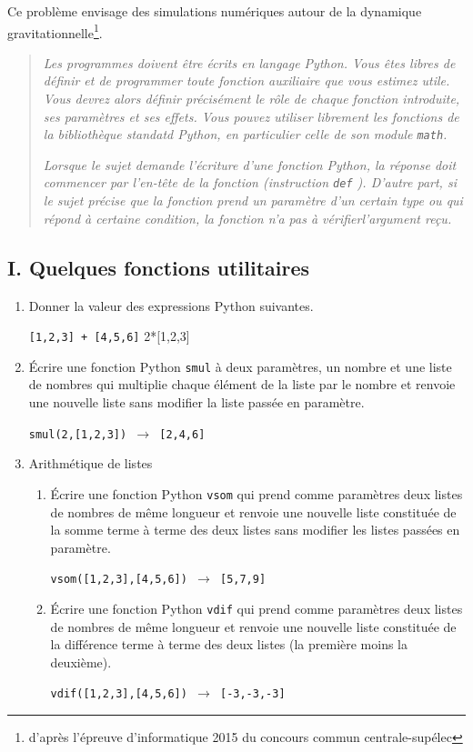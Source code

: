 Ce problème envisage des simulations numériques autour de la dynamique gravitationnelle\footnote{d'après l'épreuve d'informatique 2015 du concours commun centrale-supélec}.

\begin{quotation}
\textit{
Les programmes doivent être écrits en langage Python. Vous êtes libres de définir et de programmer toute fonction auxiliaire que vous estimez utile. Vous devrez alors définir précisément le rôle de chaque fonction introduite, ses paramètres et ses effets. Vous pouvez utiliser librement les fonctions de la bibliothèque standatd Python, en particulier celle de son module \texttt{math}.}

\textit{
Lorsque le sujet demande l'écriture d'une fonction Python, la réponse doit commencer par l'en-tête de la fonction (instruction \texttt{def} ). D'autre part, si le sujet précise que la fonction prend un paramètre d'un certain type ou qui répond à certaine condition, la fonction n'a pas à vérifierl'argument reçu.
}  
\end{quotation}

\subsection*{I. Quelques fonctions utilitaires}
\begin{enumerate}
  \item Donner la valeur des expressions Python suivantes.
\begin{center}
  \texttt{[1,2,3] + [4,5,6]} \hspace{1cm} 2*[1,2,3]
\end{center}
  \item \'Ecrire une fonction Python \texttt{smul} à deux paramètres, un nombre et une liste de nombres qui multiplie chaque élément de la liste par le nombre et renvoie une nouvelle liste sans modifier la liste passée en paramètre.
\begin{center}
  \texttt{smul(2,[1,2,3]) $\longrightarrow$  [2,4,6]}
\end{center}
\item Arithmétique de listes
\begin{enumerate}
  \item \'Ecrire une fonction Python \texttt{vsom} qui prend comme paramètres deux listes de nombres de même longueur et renvoie une nouvelle liste constituée de la somme terme à terme des deux listes  sans modifier les listes passées en paramètre.
\begin{center}
  \texttt{vsom([1,2,3],[4,5,6]) $\longrightarrow$  [5,7,9]}
\end{center}
  \item \'Ecrire une fonction Python \texttt{vdif} qui prend comme paramètres deux listes de nombres de même longueur et renvoie une nouvelle liste constituée de la différence terme à terme des deux listes (la première moins la deuxième).
\begin{center}
  \texttt{vdif([1,2,3],[4,5,6]) $\longrightarrow$  [-3,-3,-3]}
\end{center}
\end{enumerate}
\end{enumerate}

